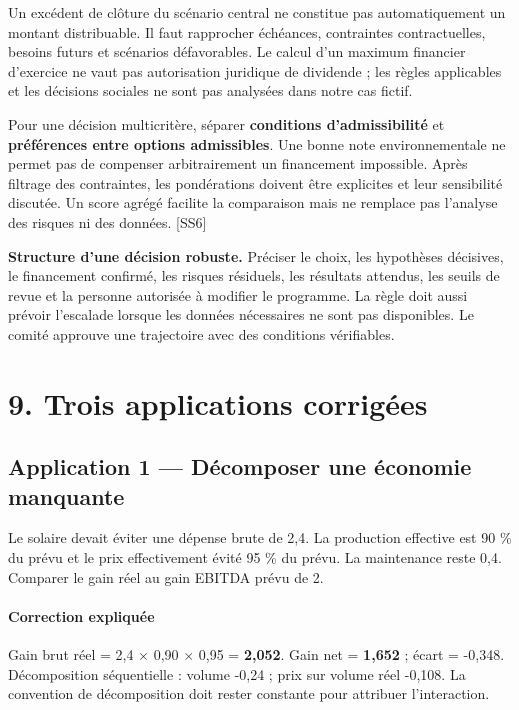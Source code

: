 \documentclass[12pt,a4paper]{article}
\begin{document}
Un excédent de clôture du scénario central ne constitue pas automatiquement un montant distribuable. Il faut rapprocher échéances, contraintes contractuelles, besoins futurs et scénarios défavorables. Le calcul d’un maximum financier d’exercice ne vaut pas autorisation juridique de dividende ; les règles applicables et les décisions sociales ne sont pas analysées dans notre cas fictif.


Pour une décision multicritère, séparer \textbf{conditions d’admissibilité} et \textbf{préférences entre options admissibles}. Une bonne note environnementale ne permet pas de compenser arbitrairement un financement impossible. Après filtrage des contraintes, les pondérations doivent être explicites et leur sensibilité discutée. Un score agrégé facilite la comparaison mais ne remplace pas l’analyse des risques ni des données. [SS6]


\textbf{Structure d’une décision robuste.} Préciser le choix, les hypothèses décisives, le financement confirmé, les risques résiduels, les résultats attendus, les seuils de revue et la personne autorisée à modifier le programme. La règle doit aussi prévoir l’escalade lorsque les données nécessaires ne sont pas disponibles. Le comité approuve une trajectoire avec des conditions vérifiables.

\section*{9. Trois applications corrigées}

\subsection*{Application 1 --- Décomposer une économie manquante}
Le solaire devait éviter une dépense brute de 2,4. La production effective est 90 \% du prévu et le prix effectivement évité 95 \% du prévu. La maintenance reste 0,4. Comparer le gain réel au gain EBITDA prévu de 2.


\paragraph{Correction expliquée}
Gain brut réel = 2,4 $\times$ 0,90 $\times$ 0,95 = \textbf{2,052}. Gain net = \textbf{1,652} ; écart = -0,348. Décomposition séquentielle : volume -0,24 ; prix sur volume réel -0,108. La convention de décomposition doit rester constante pour attribuer l’interaction.
\end{document}
